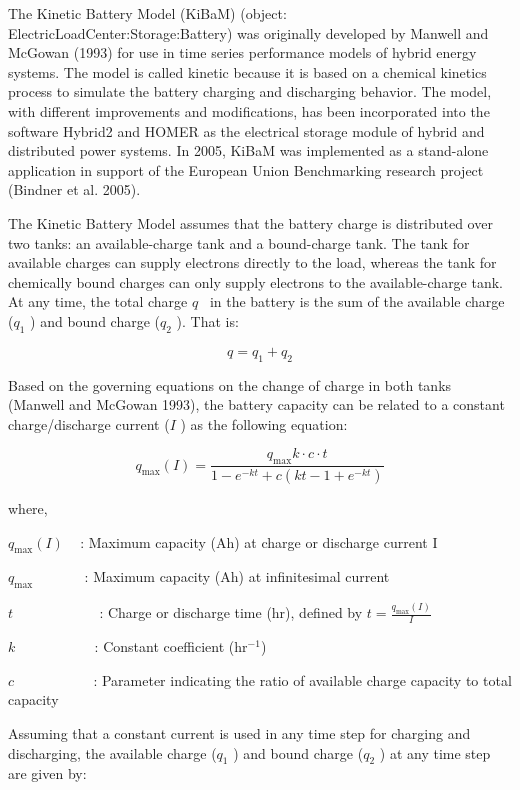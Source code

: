 The Kinetic Battery Model (KiBaM) (object: ElectricLoadCenter:Storage:Battery) was originally developed by Manwell and McGowan (1993) for use in time series performance models of hybrid energy systems. The model is called kinetic because it is based on a chemical kinetics process to simulate the battery charging and discharging behavior. The model, with different improvements and modifications, has been incorporated into the software Hybrid2 and HOMER as the electrical storage module of hybrid and distributed power systems. In 2005, KiBaM was implemented as a stand-alone application in support of the European Union Benchmarking research project (Bindner et al. 2005).

The Kinetic Battery Model assumes that the battery charge is distributed over two tanks: an available-charge tank and a bound-charge tank. The tank for available charges can supply electrons directly to the load, whereas the tank for chemically bound charges can only supply electrons to the available-charge tank. At any time, the total charge \(q\) ~in the battery is the sum of the available charge (\({q_1}\) ) and bound charge (\({q_2}\) ). That is:

\begin{equation}
q = {q_1} + {q_2}
\end{equation}

Based on the governing equations on the change of charge in both tanks (Manwell and McGowan 1993), the battery capacity can be related to a constant charge/discharge current (\(I\) ) as the following equation:

\begin{equation}
{q_{\max }}(I) = \frac{{{q_{\max }}k \cdot c \cdot t}}{{1 - {e^{ - kt}} + c(kt - 1 + {e^{ - kt}})}}
\end{equation}

where,

\({q_{\max }}(I)\) ~ : Maximum capacity (Ah) at charge or discharge current I

\({q_{\max }}\) ~~~~~~ : Maximum capacity (Ah) at infinitesimal current

\(t\) ~~~~~~~~~~~ : Charge or discharge time (hr), defined by \(t = \frac{{{q_{\max }}(I)}}{I}\)

\(k\) ~~~~~~~~~~ : Constant coefficient (hr\(^{-1}\))

\(c\) ~~~~~~~~~~ : Parameter indicating the ratio of available charge capacity to total capacity

Assuming that a constant current is used in any time step for charging and discharging, the available charge (\({q_1}\) ) and bound charge (\({q_2}\) ) at any time step are given by:

